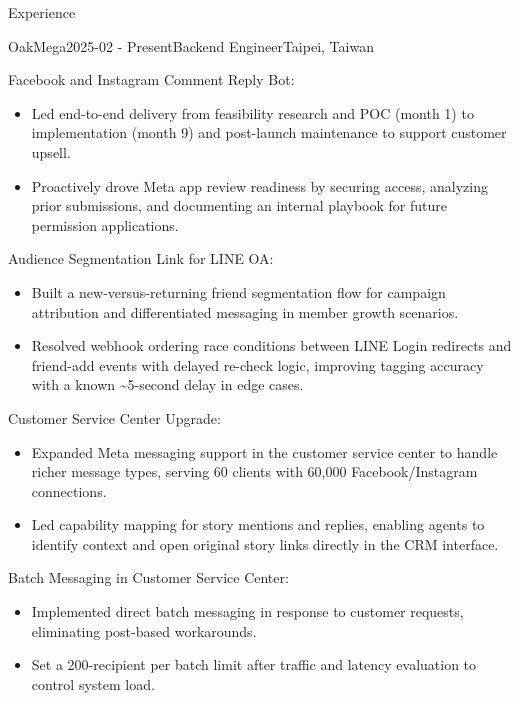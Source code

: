 \documentclass[
	11pt, %
]{resume} %
\newenvironment{myitemize}
  {\begin{itemize}
    \setlength{\itemsep}{-0.5em} \vspace{-0.5em}
  } %
  {\end{itemize}}
\begin{document}
\begin{rSection}{Experience}

	\begin{rSubsection}{OakMega}{2025-02 - Present}{Backend Engineer}{Taipei, Taiwan}
    \item Facebook and Instagram Comment Reply Bot:
    \begin{myitemize}
      \item Led end-to-end delivery from feasibility research and POC (month 1) to implementation (month 9) and post-launch maintenance to support customer upsell.
      \item Proactively drove Meta app review readiness by securing access, analyzing prior submissions, and documenting an internal playbook for future permission applications.
    \end{myitemize}
    \item Audience Segmentation Link for LINE OA:
    \begin{myitemize}
      \item Built a new-versus-returning friend segmentation flow for campaign attribution and differentiated messaging in member growth scenarios.
      \item Resolved webhook ordering race conditions between LINE Login redirects and friend-add events with delayed re-check logic, improving tagging accuracy with a known \textasciitilde5-second delay in edge cases.
    \end{myitemize}
    \item Customer Service Center Upgrade:
    \begin{myitemize}
      \item Expanded Meta messaging support in the customer service center to handle richer message types, serving 60 clients with 60,000 Facebook/Instagram connections.
      \item Led capability mapping for story mentions and replies, enabling agents to identify context and open original story links directly in the CRM interface.
    \end{myitemize}
    \item Batch Messaging in Customer Service Center:
    \begin{myitemize}
      \item Implemented direct batch messaging in response to customer requests, eliminating post-based workarounds.
      \item Set a 200-recipient per batch limit after traffic and latency evaluation to control system load.
    \end{myitemize}
  \end{rSubsection}


\end{rSection}
\end{document}
